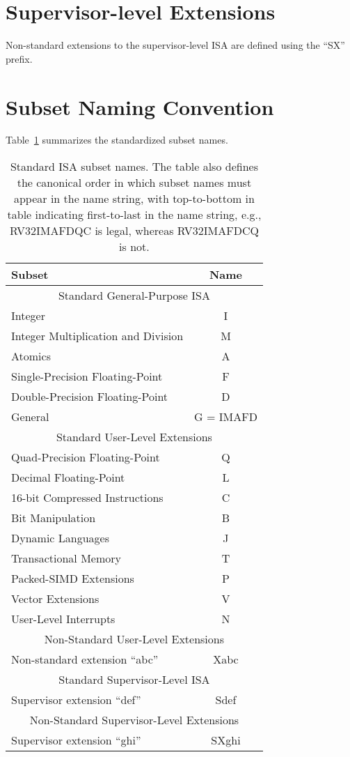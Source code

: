\section{Supervisor-level Extensions}
Non-standard extensions to the supervisor-level ISA are defined using
the ``SX'' prefix.

\section{Subset Naming Convention}
Table~\ref{isanametable} summarizes the standardized subset names.
~\\
\begin{table}[h]
\center
\begin{tabular}{|l|c|}
\hline
Subset & Name \\
\hline
\hline
\multicolumn{2}{|c|}{Standard General-Purpose ISA}\\
\hline
Integer & I \\
Integer Multiplication and Division & M \\
Atomics & A \\
Single-Precision Floating-Point & F \\
Double-Precision Floating-Point & D \\
\hline
General & G = IMAFD \\
\hline
\multicolumn{2}{|c|}{Standard User-Level Extensions}\\
\hline
Quad-Precision Floating-Point & Q \\
Decimal Floating-Point & L \\
16-bit Compressed Instructions & C \\
Bit Manipulation & B \\
Dynamic Languages & J \\
Transactional Memory & T \\
Packed-SIMD Extensions & P \\
Vector Extensions & V \\
User-Level Interrupts & N \\
\hline
\hline
\multicolumn{2}{|c|}{Non-Standard User-Level Extensions}\\
\hline
Non-standard extension ``abc'' & Xabc \\
\hline
\hline
\multicolumn{2}{|c|}{Standard Supervisor-Level ISA}\\
\hline
Supervisor extension ``def'' & Sdef \\
\hline
\hline
\multicolumn{2}{|c|}{Non-Standard Supervisor-Level Extensions}\\
\hline
Supervisor extension ``ghi'' & SXghi \\
\hline
\end{tabular}
\caption{Standard ISA subset names.  The table also defines the
  canonical order in which subset names must appear in the name
  string, with top-to-bottom in table indicating first-to-last in the
  name string, e.g., RV32IMAFDQC is legal, whereas RV32IMAFDCQ is not.}
\label{isanametable}
\end{table}



